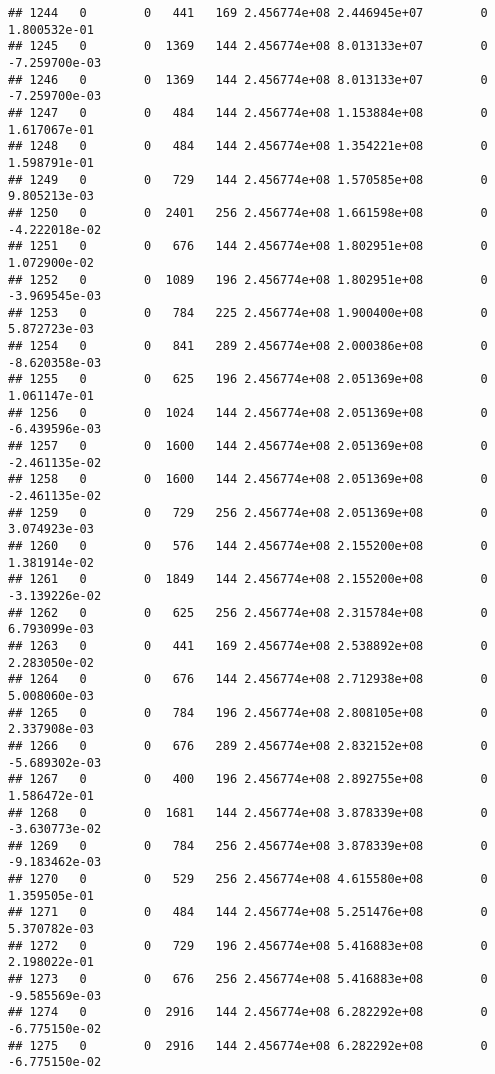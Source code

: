 \documentclass[
]{article}
\begin{document}
\begin{enumerate}
\begin{verbatim}
## 1244   0        0   441   169 2.456774e+08 2.446945e+07        0  1.800532e-01
## 1245   0        0  1369   144 2.456774e+08 8.013133e+07        0 -7.259700e-03
## 1246   0        0  1369   144 2.456774e+08 8.013133e+07        0 -7.259700e-03
## 1247   0        0   484   144 2.456774e+08 1.153884e+08        0  1.617067e-01
## 1248   0        0   484   144 2.456774e+08 1.354221e+08        0  1.598791e-01
## 1249   0        0   729   144 2.456774e+08 1.570585e+08        0  9.805213e-03
## 1250   0        0  2401   256 2.456774e+08 1.661598e+08        0 -4.222018e-02
## 1251   0        0   676   144 2.456774e+08 1.802951e+08        0  1.072900e-02
## 1252   0        0  1089   196 2.456774e+08 1.802951e+08        0 -3.969545e-03
## 1253   0        0   784   225 2.456774e+08 1.900400e+08        0  5.872723e-03
## 1254   0        0   841   289 2.456774e+08 2.000386e+08        0 -8.620358e-03
## 1255   0        0   625   196 2.456774e+08 2.051369e+08        0  1.061147e-01
## 1256   0        0  1024   144 2.456774e+08 2.051369e+08        0 -6.439596e-03
## 1257   0        0  1600   144 2.456774e+08 2.051369e+08        0 -2.461135e-02
## 1258   0        0  1600   144 2.456774e+08 2.051369e+08        0 -2.461135e-02
## 1259   0        0   729   256 2.456774e+08 2.051369e+08        0  3.074923e-03
## 1260   0        0   576   144 2.456774e+08 2.155200e+08        0  1.381914e-02
## 1261   0        0  1849   144 2.456774e+08 2.155200e+08        0 -3.139226e-02
## 1262   0        0   625   256 2.456774e+08 2.315784e+08        0  6.793099e-03
## 1263   0        0   441   169 2.456774e+08 2.538892e+08        0  2.283050e-02
## 1264   0        0   676   144 2.456774e+08 2.712938e+08        0  5.008060e-03
## 1265   0        0   784   196 2.456774e+08 2.808105e+08        0  2.337908e-03
## 1266   0        0   676   289 2.456774e+08 2.832152e+08        0 -5.689302e-03
## 1267   0        0   400   196 2.456774e+08 2.892755e+08        0  1.586472e-01
## 1268   0        0  1681   144 2.456774e+08 3.878339e+08        0 -3.630773e-02
## 1269   0        0   784   256 2.456774e+08 3.878339e+08        0 -9.183462e-03
## 1270   0        0   529   256 2.456774e+08 4.615580e+08        0  1.359505e-01
## 1271   0        0   484   144 2.456774e+08 5.251476e+08        0  5.370782e-03
## 1272   0        0   729   196 2.456774e+08 5.416883e+08        0  2.198022e-01
## 1273   0        0   676   256 2.456774e+08 5.416883e+08        0 -9.585569e-03
## 1274   0        0  2916   144 2.456774e+08 6.282292e+08        0 -6.775150e-02
## 1275   0        0  2916   144 2.456774e+08 6.282292e+08        0 -6.775150e-02

\end{verbatim}
\end{enumerate}
\end{document}
